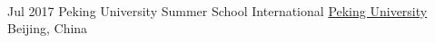 \documentclass[a4paper]{twentysecondcv} %
\begin{document}
\begin{twenty}
{\begin{itemize}
		\end{itemize}
    	}
    \\
	\twentyitem
    	{Jul 2017}
		{}
        {Peking University Summer School International}
        {\href{http://www.oir.pku.edu.cn/summerschool/}{Peking University}}
        {Beijing, China}
        {
    	}
\end{twenty}


\end{document}

